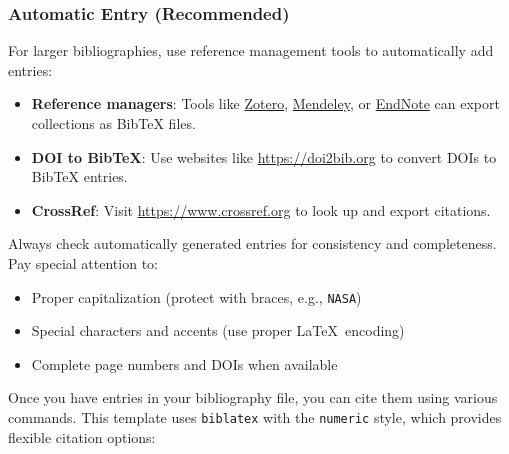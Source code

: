 \subsubsection*{Automatic Entry (Recommended)}
For larger bibliographies, use reference management tools to automatically add entries:

\begin{itemize}
    \item \textbf{Reference managers}: Tools like \href{https://www.zotero.org/}{Zotero}, \href{https://www.mendeley.com/}{Mendeley}, or \href{https://endnote.com/}{EndNote} can export collections as BibTeX files.
    \item \textbf{DOI to BibTeX}: Use websites like \url{https://doi2bib.org} to convert DOIs to BibTeX entries.
    \item \textbf{CrossRef}: Visit \url{https://www.crossref.org} to look up and export citations.
\end{itemize}


Always check automatically generated entries for consistency and completeness. Pay special attention to:
\begin{itemize}
    \item Proper capitalization (protect with braces, e.g., \texttt{{NASA}})
    \item Special characters and accents (use proper \LaTeX\ encoding)
    \item Complete page numbers and DOIs when available
\end{itemize}

Once you have entries in your bibliography file, you can cite them using various commands. This template uses \texttt{biblatex} with the \texttt{numeric} style, which provides flexible citation options:


